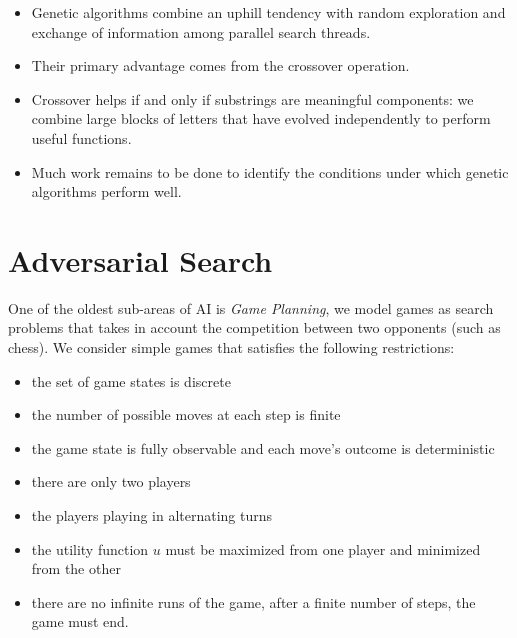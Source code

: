 \documentclass[10pt, letterpaper]{report}
\begin{document}
\begin{itemize}
    \item Genetic algorithms combine an uphill tendency with random exploration and exchange of information among parallel search threads.
    \item Their primary advantage comes from the crossover operation.
    \item Crossover helps if and only if substrings are meaningful components: we combine large blocks of letters that have evolved independently to perform useful functions.
    \item Much work remains to be done to identify the conditions under which genetic algorithms perform well.
\end{itemize}
\section{Adversarial Search}
One of the oldest sub-areas of AI is \textit{Game Planning}, we model games as search problems that takes in account the competition between two opponents (such as chess). We consider simple games that satisfies the following restrictions:\begin{itemize}
    \item the set of game states is discrete 
    \item the number of possible moves at each step is finite 
    \item the game state is fully observable and each move's outcome is deterministic
    \item there are only two players
    \item the players playing in alternating turns 
    \item the utility function $u$ must be maximized from one player and minimized from the other 
    \item there are no infinite runs of the game, after a finite number of steps, the game must end.
\end{itemize}
\end{document}

